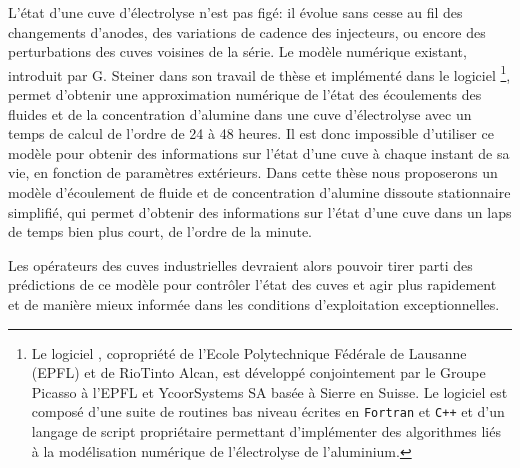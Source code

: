 L'état d'une cuve d'électrolyse n'est pas figé: il évolue sans cesse
au fil des changements d'anodes, des variations de cadence des
injecteurs, ou encore des perturbations des cuves voisines de la
série. Le modèle numérique existant, introduit par G. Steiner dans son
travail de thèse \cite{Steiner2009} et implémenté dans le logiciel
\alucell{}\footnote{Le logiciel \alucell{}, copropriété de l'Ecole
  Polytechnique Fédérale de Lausanne (EPFL) et de RioTinto Alcan, est
  développé conjointement par le Groupe Picasso à l'EPFL et
  YcoorSystems SA basée à Sierre en Suisse. Le logiciel \alucell{} est
  composé d'une suite de routines bas niveau écrites en
  \texttt{Fortran} et \texttt{C++} et d'un langage de script
  propriétaire permettant d'implémenter des algorithmes liés à la
  modélisation numérique de l'électrolyse de l'aluminium.}, permet
d'obtenir une approximation numérique de l'état des écoulements des
fluides et de la concentration d'alumine dans une cuve d'électrolyse
avec un temps de calcul de l'ordre de \num{24} à \num{48} heures. Il
est donc impossible d'utiliser ce modèle pour obtenir des informations
sur l'état d'une cuve à chaque instant de sa vie, en fonction de
paramètres extérieurs. Dans cette thèse nous proposerons un modèle
d'écoulement de fluide et de concentration d'alumine dissoute
stationnaire simplifié, qui permet d'obtenir des informations sur
l'état d'une cuve dans un laps de temps bien plus court, de l'ordre de
la minute.

Les opérateurs des cuves industrielles devraient alors pouvoir tirer
parti des prédictions de ce modèle pour contrôler l'état des cuves
et agir plus rapidement et de manière mieux informée dans les
conditions d'exploitation exceptionnelles.
